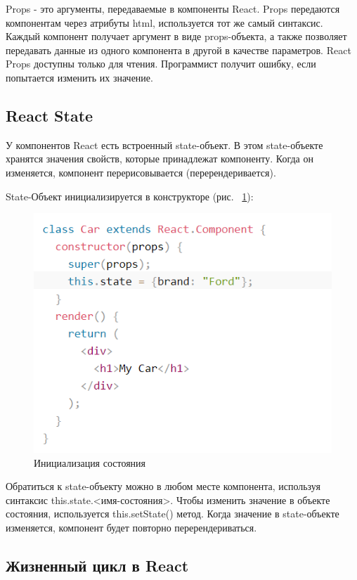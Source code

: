 \documentclass[12pt, a4paper]{diplom}
\begin{document}
Props - это аргументы, передаваемые в компоненты React.
Props передаются компонентам через атрибуты html, используется тот же самый синтаксис. Каждый компонент получает аргумент в виде props-объекта, а также позволяет передавать данные из одного компонента в другой в качестве параметров. React Props доступны только для чтения. Программист получит ошибку, если попытается изменить их значение.

\subsection{React State}
У компонентов React есть встроенный state-объект.
В этом state-объекте хранятся значения свойств, которые принадлежат компоненту.
Когда он изменяется, компонент перерисовывается (перерендеривается).

State-Объект инициализируется в конструкторе (рис. ~\ref{b}):

\begin{figure}[!ht]
\centering
\includegraphics[width=1\textwidth]{resources/state.png}
\caption{Инициализация состояния}
\label{b}
\end{figure}

Обратиться к state-объекту можно в любом месте компонента, используя синтаксис this.state.<имя-состояния>. Чтобы изменить значение в объекте состояния, используется this.setState() метод.
Когда значение в state-объекте изменяется, компонент будет повторно перерендериваться.

\subsection{Жизненный цикл в React}
\end{document}
